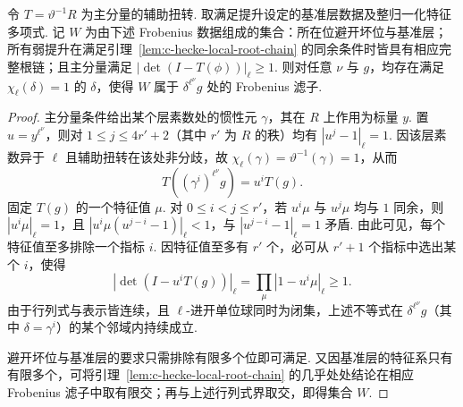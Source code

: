 \begin{lemma}
\label{lem:c-hecke-allowed-frobenii}
\emitthmsource
令 $T=\vartheta^{-1}R$ 为主分量的辅助扭转. 取满足提升设定的基准层数据及整归一化特征多项式. 记 $W$ 为由下述 Frobenius 数据组成的集合：所在位避开坏位与基准层；所有弱提升在满足引理~\ref{lem:c-hecke-local-root-chain} 的同余条件时皆具有相应完整根链；且主分量满足 $|\det(I-T(\phi))|_\ell\ge1$. 则对任意 $\nu$ 与 $g$，均存在满足 $\chi_\ell(\delta)=1$ 的 $\delta$，使得 $W$ 属于 $\delta^{\ell^\nu}g$ 处的 Frobenius 滤子.
\end{lemma}
\begin{proof}
主分量条件给出某个层素数处的惯性元 $\gamma$，其在 $R$ 上作用为标量 $y$. 置 $u=y^{\ell^\nu}$，则对 $1\le j\le4r'+2$（其中 $r'$ 为 $R$ 的秩）均有 $|u^j-1|_\ell=1$. 因该层素数异于 $\ell$ 且辅助扭转在该处非分歧，故 $\chi_\ell(\gamma)=\vartheta^{-1}(\gamma)=1$，从而
\[
 T((\gamma^i)^{\ell^\nu}g)=u^i T(g).
\]
固定 $T(g)$ 的一个特征值 $\mu$. 对 $0\le i<j\le r'$，若 $u^i\mu$ 与 $u^j\mu$ 均与 $1$ 同余，则 $|u^i\mu|_\ell=1$，且
$|u^i\mu(u^{j-i}-1)|_\ell<1$，与 $|u^{j-i}-1|_\ell=1$ 矛盾. 由此可见，每个特征值至多排除一个指标 $i$. 因特征值至多有 $r'$ 个，必可从 $r'+1$ 个指标中选出某个 $i$，使得
\[
 |\det(I-u^iT(g))|_\ell=\prod_\mu |1-u^i\mu|_\ell\ge1.
\]
由于行列式与表示皆连续，且 $\ell$-进开单位球同时为闭集，上述不等式在 $\delta^{\ell^\nu}g$（其中 $\delta=\gamma^i$）的某个邻域内持续成立.

避开坏位与基准层的要求只需排除有限多个位即可满足. 又因基准层的特征系只有有限多个，可将引理~\ref{lem:c-hecke-local-root-chain} 的几乎处处结论在相应 Frobenius 滤子中取有限交；再与上述行列式界取交，即得集合 $W$.
\end{proof}

